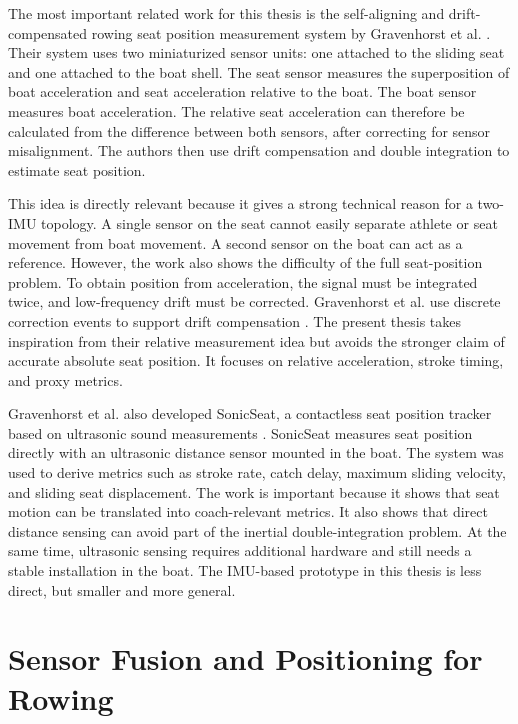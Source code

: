 The most important related work for this thesis is the self-aligning and drift-compensated rowing seat position measurement system by Gravenhorst et al. \cite{gravenhorst_self-aligning_2012}. Their system uses two miniaturized sensor units: one attached to the sliding seat and one attached to the boat shell. The seat sensor measures the superposition of boat acceleration and seat acceleration relative to the boat. The boat sensor measures boat acceleration. The relative seat acceleration can therefore be calculated from the difference between both sensors, after correcting for sensor misalignment. The authors then use drift compensation and double integration to estimate seat position.

This idea is directly relevant because it gives a strong technical reason for a two-IMU topology. A single sensor on the seat cannot easily separate athlete or seat movement from boat movement. A second sensor on the boat can act as a reference. However, the work also shows the difficulty of the full seat-position problem. To obtain position from acceleration, the signal must be integrated twice, and low-frequency drift must be corrected. Gravenhorst et al. use discrete correction events to support drift compensation \cite{gravenhorst_self-aligning_2012}. The present thesis takes inspiration from their relative measurement idea but avoids the stronger claim of accurate absolute seat position. It focuses on relative acceleration, stroke timing, and proxy metrics.

Gravenhorst et al. also developed SonicSeat, a contactless seat position tracker based on ultrasonic sound measurements \cite{gravenhorst_sonicseat_2012}. SonicSeat measures seat position directly with an ultrasonic distance sensor mounted in the boat. The system was used to derive metrics such as stroke rate, catch delay, maximum sliding velocity, and sliding seat displacement. The work is important because it shows that seat motion can be translated into coach-relevant metrics. It also shows that direct distance sensing can avoid part of the inertial double-integration problem. At the same time, ultrasonic sensing requires additional hardware and still needs a stable installation in the boat. The IMU-based prototype in this thesis is less direct, but smaller and more general.

\section{Sensor Fusion and Positioning for Rowing}

